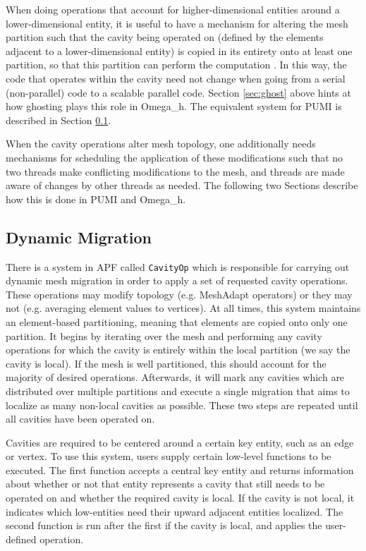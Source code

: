 When doing operations that account for higher-dimensional entities
around a lower-dimensional entity, it is useful to have a mechanism
for altering the mesh partition such that the cavity being operated
on (defined by the elements adjacent to a lower-dimensional entity)
is copied in its entirety onto at least one partition, so that this
partition can perform the computation \cite{de1999parallel}.
In this way, the code that operates within the cavity need not change
when going from a serial (non-parallel) code to a scalable parallel code.
Section \ref{sec:ghost} above hints at how ghosting plays this role
in Omega\_h.
The equivalent system for PUMI is described in Section \ref{sec:cavity_operator}.

When the cavity operations alter mesh topology, one additionally needs
mechanisms for scheduling the application of these modifications
such that no two threads make conflicting modifications to the mesh,
and threads are made aware of changes by other threads as needed.
The following two Sections describe how this is done in PUMI and Omega\_h.

\subsection{Dynamic Migration}
\label{sec:cavity_operator}

There is a system in APF called \texttt{CavityOp} which is responsible
for carrying out dynamic mesh migration in order to apply a set
of requested cavity operations.
These operations may modify topology (e.g. MeshAdapt operators)
or they may not (e.g. averaging element values to vertices).
At all times, this system maintains an element-based partitioning,
meaning that elements are copied onto only one partition.
It begins by iterating over the mesh and performing any
cavity operations for which the cavity is entirely within the
local partition (we say the cavity is local).
If the mesh is well partitioned, this should account for the majority
of desired operations.
Afterwards, it will mark any cavities which are distributed over
multiple partitions and execute a single migration that aims
to localize as many non-local cavities as possible.
These two steps are repeated until all cavities have been operated on.

Cavities are required to be centered around a certain key entity,
such as an edge or vertex.
To use this system, users supply certain low-level functions
to be executed.
The first function accepts a central key entity and returns information
about whether or not that entity represents a cavity that still needs
to be operated on and whether the required cavity is local.
If the cavity is not local, it indicates which low-entities need their
upward adjacent entities localized.
The second function is run after the first if the cavity is local,
and applies the user-defined operation.

